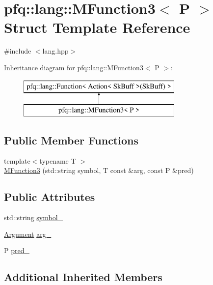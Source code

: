 \hypertarget{structpfq_1_1lang_1_1MFunction3}{\section{pfq\+:\+:lang\+:\+:M\+Function3$<$ P $>$ Struct Template Reference}
\label{structpfq_1_1lang_1_1MFunction3}
}


{\ttfamily \#include $<$lang.\+hpp$>$}

Inheritance diagram for pfq\+:\+:lang\+:\+:M\+Function3$<$ P $>$\+:\begin{figure}[H]
\begin{center}
\leavevmode
\includegraphics[height=2.000000cm]{structpfq_1_1lang_1_1MFunction3}
\end{center}
\end{figure}
\subsection*{Public Member Functions}
\begin{DoxyCompactItemize}
\item 
{\footnotesize template$<$typename T $>$ }\\\hyperlink{structpfq_1_1lang_1_1MFunction3_a2987c0bd5f03e05f11c7692e7bced250}{M\+Function3} (std\+::string symbol, T const \&arg, const P \&pred)
\end{DoxyCompactItemize}
\subsection*{Public Attributes}
\begin{DoxyCompactItemize}
\item 
std\+::string \hyperlink{structpfq_1_1lang_1_1MFunction3_ac62b5953f995ac41fe11b68799317139}{symbol\+\_\+}
\item 
\hyperlink{structpfq_1_1lang_1_1Argument}{Argument} \hyperlink{structpfq_1_1lang_1_1MFunction3_ae20e5466578e1d49d86b1e38e75ce0bc}{arg\+\_\+}
\item 
P \hyperlink{structpfq_1_1lang_1_1MFunction3_a54985d2d3ed12bd63f03aaf6d495a004}{pred\+\_\+}
\end{DoxyCompactItemize}
\subsection*{Additional Inherited Members}


